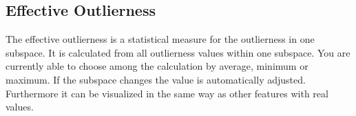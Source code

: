 \subsection{Effective Outlierness}
The effective outlierness is a statistical measure for the outlierness in one subspace. It is calculated from all outlierness values within one subspace. You are currently able to choose among the calculation by average, minimum or maximum. If the subspace changes the value is automatically adjusted. Furthermore it can be visualized in the same way as other features with real values.

